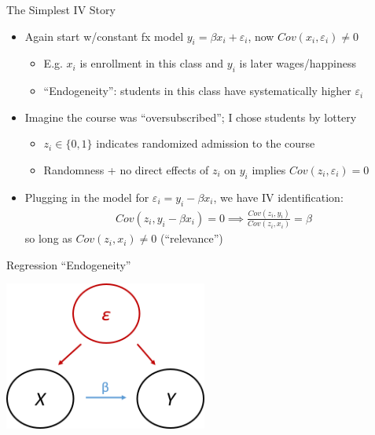 \documentclass[11pt, english]{beamer}
\begin{document}
	\begin{frame}{The Simplest IV Story}
		\begin{itemize}
			\item Again start w/constant fx model $y_{i}=\beta x_{i}+\varepsilon_{i}$,
				now $Cov(x_{i},\varepsilon_{i})\neq 0$
				\smallskip
				\begin{itemize}
					\item E.g. $x_{i}$ is enrollment in this class and $y_{i}$ is later
						wages/happiness
						\smallskip

					\item ``Endogeneity'': students in this class have systematically
						higher $\varepsilon_{i}$
				\end{itemize}
				\bigskip
				\pause{}

			\item Imagine the course was ``oversubscribed''; I chose students by
				lottery
				\smallskip
				\begin{itemize}
					\item $z_{i}\in\{0,1\}$ indicates randomized admission to the course
						\smallskip

					\item Randomness + no direct effects of $z_{i}$ on $y_{i}$ implies $Cov
						(z_{i},\varepsilon_{i})=0$
				\end{itemize}
				\bigskip
				\pause{}

			\item Plugging in the model for $\varepsilon_{i}=y_{i}-\beta x_{i}$, we
				have IV identification:
				\begin{align*}
					Cov(z_{i},y_{i}-\beta x_{i})=0\implies \frac{Cov(z_{i},y_{i})}{Cov(z_{i},x_{i})}=\beta
				\end{align*}
				so long as $Cov(z_{i},x_{i})\neq 0$ (``relevance'')
		\end{itemize}
	\end{frame}

	\begin{frame}{Regression ``Endogeneity''}
		\begin{center}
			\includegraphics[width=0.5\textwidth]{figures/dag2.png}
		\end{center}
	\end{frame}
\end{document}
